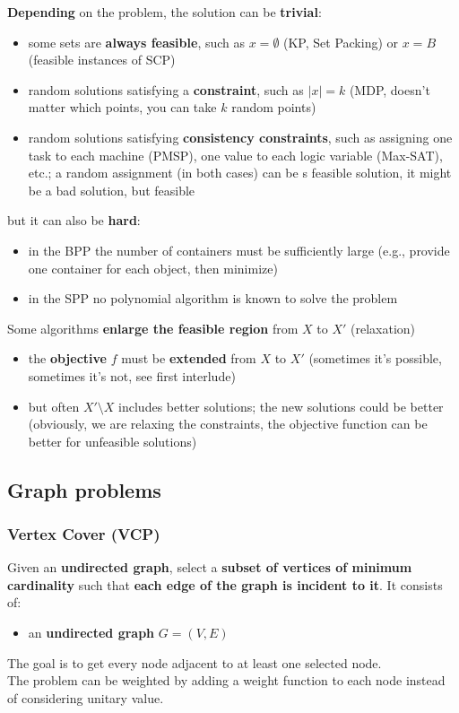 \textbf{Depending} on the problem, the solution can be \textbf{trivial}: 
\begin{itemize}
	\item some sets are \textbf{always feasible}, such as $x = \emptyset$ (KP, Set Packing) or $x = B$ (feasible instances of SCP)
	\item random solutions satisfying a \textbf{constraint}, such as $|x| = k$ (MDP, doesn't matter which points, you can take $k$ random points)
	\item random solutions satisfying \textbf{consistency constraints}, such as assigning one task to each machine (PMSP), one value to each logic variable (Max-SAT), etc.; a random assignment (in both cases) can be s feasible solution, it might be a bad solution, but feasible
\end{itemize}
but it can also be \textbf{hard}:
\begin{itemize}
	\item in the BPP the number of containers must be sufficiently large (e.g., provide one container for each object, then minimize)
	\item in the SPP no polynomial algorithm is known to solve the problem
\end{itemize}
Some algorithms \textbf{enlarge the feasible region} from $X$ to $X'$ (relaxation)
\begin{itemize}
	\item the \textbf{objective} $f$ must be \textbf{extended} from $X$ to $X'$ (sometimes it's possible, sometimes it's not, see first interlude)
	\item but often $X' \setminus X$ includes better solutions; the new solutions could be better (obviously, we are relaxing the constraints, the objective function can be better for unfeasible solutions)
\end{itemize}

\newpage

\subsection{Graph problems}
\subsubsection{Vertex Cover (VCP)}
Given an \textbf{undirected graph}, select a \textbf{subset of vertices of minimum cardinality} such that \textbf{each edge of the graph is incident to it}. It consists of:
\begin{itemize}
	\item an \textbf{undirected graph} $G = (V,E)$
\end{itemize}
The goal is to get every node adjacent to at least one selected node.\\
The problem can be weighted by adding a weight function to each node instead of considering unitary value.\\

